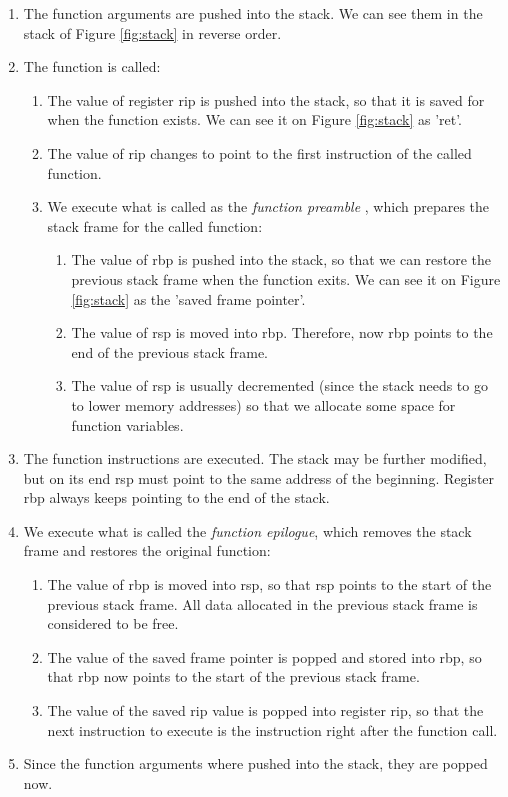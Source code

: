 \begin{enumerate}
\item The function arguments are pushed into the stack. We can see them in the stack of Figure \ref{fig:stack} in reverse order. 
\item The function is called:
\begin{enumerate}
	\item The value of register rip is pushed into the stack, so that it is saved for when the function exists. We can see it on Figure \ref{fig:stack} as 'ret'.
	\item The value of rip changes to point to the first instruction of the called function.
\item We execute what is called as the \textit{function preamble} \cite{8664_params_abi_p18}, which prepares the stack frame for the called function:
\begin{enumerate}
	\item The value of rbp is pushed into the stack, so that we can restore the previous stack frame when the function exits. We can see it on Figure \ref{fig:stack} as the 'saved frame pointer'.
	\item The value of rsp is moved into rbp. Therefore, now rbp points to the end of the previous stack frame.
	\item The value of rsp is usually decremented (since the stack needs to go to lower memory addresses) so that we allocate some space for function variables.
\end{enumerate}
\end{enumerate}
\item The function instructions are executed. The stack may be further modified, but on its end rsp must point to the same address of the beginning. Register rbp always keeps pointing to the end of the stack.
\item We execute what is called the \textit{function epilogue}, which removes the stack frame and restores the original function:
\begin{enumerate}
	\item The value of rbp is moved into rsp, so that rsp points to the start of the previous stack frame. All data allocated in the previous stack frame is considered to be free.
	\item The value of the saved frame pointer is popped and stored into rbp, so that rbp now points to the start of the previous stack frame.
	\item The value of the saved rip value is popped into register rip, so that the next instruction to execute is the instruction right after the function call.
\end{enumerate}
\item Since the function arguments where pushed into the stack, they are popped now.
\end{enumerate}



